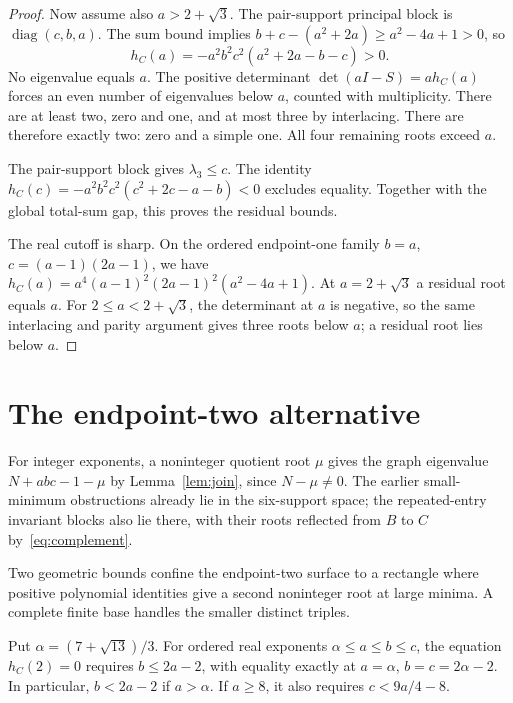 \begin{proof}
Now assume also $a>2+\sqrt3$.
The pair-support principal block is $\operatorname{diag}(c,b,a)$.
The sum bound implies
$b+c-(a^2+2a)\geq a^2-4a+1>0$, so
\[
 h_C(a)=-a^2b^2c^2(a^2+2a-b-c)>0.
\]
No eigenvalue equals $a$. The positive determinant
$\det(aI-S)=a h_C(a)$ forces an even number of eigenvalues below
$a$, counted with multiplicity. There are at least two, zero and one,
and at most three by interlacing. There are therefore exactly two:
zero and a simple one. All four remaining roots exceed $a$.

The pair-support block gives $\lambda_3\leq c$. The identity
$h_C(c)=-a^2b^2c^2(c^2+2c-a-b)<0$ excludes equality.
Together with the global total-sum gap, this proves the residual bounds.

The real cutoff is sharp. On the ordered endpoint-one family
$b=a$, $c=(a-1)(2a-1)$, we have
$h_C(a)=a^4(a-1)^2(2a-1)^2(a^2-4a+1)$.
At $a=2+\sqrt3$ a residual root equals $a$. For $2\leq a<2+\sqrt3$,
the determinant at $a$ is negative, so the same interlacing and parity
argument gives three roots below $a$; a residual root lies below $a$.
\end{proof}

\section{The endpoint-two alternative}
For integer exponents, a noninteger quotient root $\mu$ gives the graph
eigenvalue $N+abc-1-\mu$ by Lemma~\ref{lem:join}, since $N-\mu\ne0$.
The earlier small-minimum obstructions already lie in the six-support
space; the repeated-entry invariant blocks also lie there, with their
roots reflected from $B$ to $C$ by~\eqref{eq:complement}.

Two geometric bounds confine the endpoint-two surface to a rectangle
where positive polynomial identities give a second noninteger root at
large minima. A complete finite base handles the smaller distinct triples.

\begin{lemma}
\label{lem:endpoint-two-rectangle}
Put $\alpha=(7+\sqrt{13})/3$.
For ordered real exponents $\alpha\leq a\leq b\leq c$, the equation
$h_C(2)=0$ requires $b\leq2a-2$, with equality exactly at
$a=\alpha$, $b=c=2\alpha-2$. In particular, $b<2a-2$ if $a>\alpha$.
If $a\geq8$, it also requires
$c<9a/4-8$.
\end{lemma}

